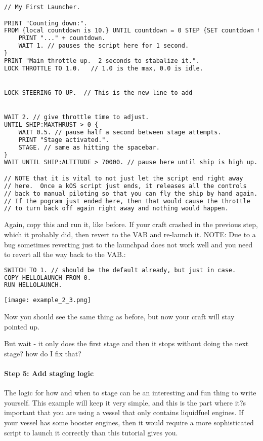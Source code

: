 \begin{lstlisting}[frame=single,language=XML]
// My First Launcher.

PRINT "Counting down:".
FROM {local countdown is 10.} UNTIL countdown = 0 STEP {SET countdown to countdown - 1.} DO {
    PRINT "..." + countdown.
    WAIT 1. // pauses the script here for 1 second.
}
PRINT "Main throttle up.  2 seconds to stabalize it.".
LOCK THROTTLE TO 1.0.   // 1.0 is the max, 0.0 is idle.


LOCK STEERING TO UP.  // This is the new line to add


WAIT 2. // give throttle time to adjust.
UNTIL SHIP:MAXTHRUST > 0 {
    WAIT 0.5. // pause half a second between stage attempts.
    PRINT "Stage activated.".
    STAGE. // same as hitting the spacebar.
}
WAIT UNTIL SHIP:ALTITUDE > 70000. // pause here until ship is high up.

// NOTE that it is vital to not just let the script end right away
// here.  Once a kOS script just ends, it releases all the controls
// back to manual piloting so that you can fly the ship by hand again.
// If the pogram just ended here, then that would cause the throttle
// to turn back off again right away and nothing would happen.
\end{lstlisting} 

Again, copy this and run it, like before. If your craft crashed in the previous step, which it probably did, then revert to the VAB and re-launch it. NOTE: Due to a bug sometimes reverting just to the launchpad does not work well and you need to revert all the way back to the VAB.:

\begin{lstlisting}[frame=single,language=XML]
SWITCH TO 1. // should be the default already, but just in case.
COPY HELLOLAUNCH FROM 0.
RUN HELLOLAUNCH.
\end{lstlisting} 

\begin{center}
\texttt{[image: example\_2\_3.png]}
\end{center}

Now you should see the same thing as before, but now your craft will stay pointed up.

But wait - it only does the first stage and then it stops without doing the next stage? how do I fix that?

\paragraph{Step 5: Add staging logic}
The logic for how and when to stage can be an interesting and fun thing to write yourself. This example will keep it very simple, and this is the part where it?s important that you are using a vessel that only contains liquidfuel engines. If your vessel has some booster engines, then it would require a more sophisticated script to launch it correctly than this tutorial gives you.

